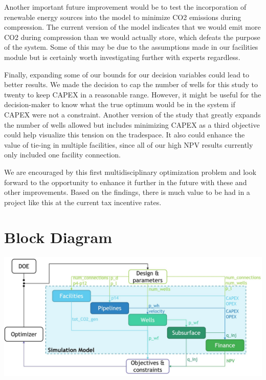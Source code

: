 \documentclass[balance,upint,subscriptcorrection,varvw,mathalfa=cal=boondoxo,spanish,french,vietnamese,russian,greek,pdf-a,colorlinks]{asmeconf}
\begin{document}
Another important future improvement would be to test the incorporation of renewable energy sources into the model to minimize CO2 emissions during compression. The current version of the model indicates that we would emit more CO2 during compression than we would actually store, which defeats the purpose of the system. Some of this may be due to the assumptions made in our facilities module but is certainly worth investigating further with experts regardless.

Finally, expanding some of our bounds for our decision variables could lead to better results. We made the decision to cap the number of wells for this study to twenty to keep CAPEX in a reasonable range. However, it might be useful for the decision-maker to know what the true optimum would be in the system if CAPEX were not a constraint. Another version of the study that greatly expands the number of wells allowed but includes minimizing CAPEX as a third objective could help visualize this tension on the tradespace. It also could enhance the value of tie-ing in multiple facilities, since all of our high NPV results currently only included one facility connection.

We are encouraged by this first multidisciplinary optimization problem and look forward to the opportunity to enhance it further in the future with these and other improvements. Based on the findings, there is much value to be had in a project like this at the current tax incentive rates.



\clearpage
\appendix

\section[Appendix A]{Block Diagram}\label{appendix:a}

\begin{center}
    \includegraphics[width=2\linewidth]{images/Block_diagram.jpg}
\end{center}
 \clearpage
\end{document}
